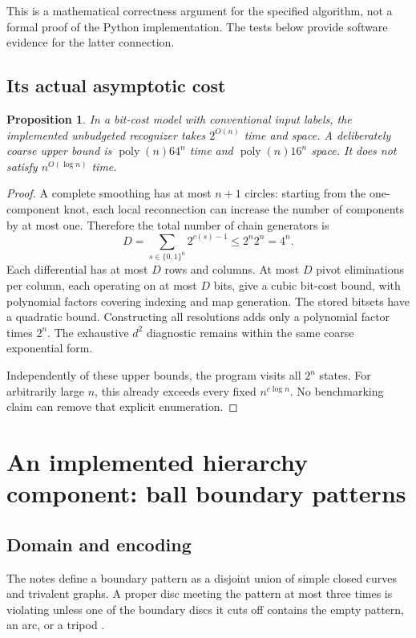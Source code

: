 \documentclass[11pt]{article}
\newtheorem{proposition}[theorem]{Proposition}
\theoremstyle{definition}\newtheorem{definition}[theorem]{Definition}
\begin{document}
This is a mathematical correctness argument for the specified algorithm,
not a formal proof of the Python implementation. The tests below provide
software evidence for the latter connection.

\subsection{Its actual asymptotic cost}

\begin{proposition}
In a bit-cost model with conventional input labels, the implemented
unbudgeted recognizer takes $2^{O(n)}$ time and space. A deliberately coarse
upper bound is $\operatorname{poly}(n)64^n$ time and
$\operatorname{poly}(n)16^n$ space. It does not satisfy
$n^{O(\log n)}$ time.
\end{proposition}
\begin{proof}
A complete smoothing has at most $n+1$ circles: starting from the one-component
knot, each local reconnection can increase the number of components by at most
one. Therefore the total number of chain generators is
\[
 D=\sum_{s\in\{0,1\}^n}2^{c(s)-1}\le 2^n2^n=4^n.
\]
Each differential has at most $D$ rows and columns. At most $D$ pivot
eliminations per column, each operating on at most $D$ bits, give a cubic
bit-cost bound, with polynomial factors covering indexing and map generation.
The stored bitsets have a quadratic bound. Constructing all resolutions adds
only a polynomial factor times $2^n$. The exhaustive $d^2$ diagnostic remains
within the same coarse exponential form.

Independently of these upper bounds, the program visits all $2^n$ states.
For arbitrarily large $n$, this already exceeds every fixed
$n^{c\log n}$. No benchmarking claim can remove that explicit enumeration.
\end{proof}

\section{An implemented hierarchy component: ball boundary patterns}

\subsection{Domain and encoding}

The notes define a boundary pattern as a disjoint union of simple closed
curves and trivalent graphs. A proper disc meeting the pattern at most three
times is violating unless one of the boundary discs it cuts off contains the
empty pattern, an arc, or a tripod
\cite[physical pages 24--25]{notes}.
\end{document}
